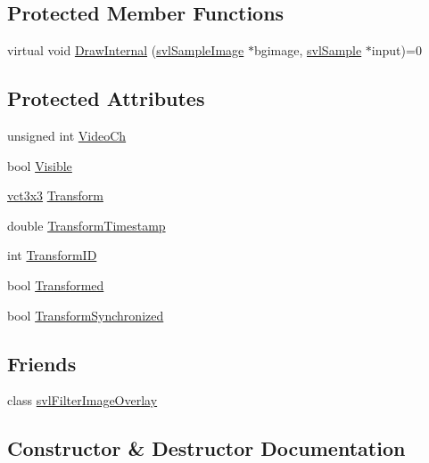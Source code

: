 \subsection*{Protected Member Functions}
\begin{DoxyCompactItemize}
\item 
virtual void \hyperlink{classsvl_overlay_a6e6e5650596284a59be75be7dc073cd2}{Draw\+Internal} (\hyperlink{classsvl_sample_image}{svl\+Sample\+Image} $\ast$bgimage, \hyperlink{classsvl_sample}{svl\+Sample} $\ast$input)=0
\end{DoxyCompactItemize}
\subsection*{Protected Attributes}
\begin{DoxyCompactItemize}
\item 
unsigned int \hyperlink{classsvl_overlay_a3cb587204bc369c7f692d0db7cb74e72}{Video\+Ch}
\item 
bool \hyperlink{classsvl_overlay_a9cdf3aba60b4c4a291a5adc1c1cba139}{Visible}
\item 
\hyperlink{vct_fixed_size_matrix_types_8h_aac4a419dacf9282410675d42ebc86a7c}{vct3x3} \hyperlink{classsvl_overlay_aec4ed3a91cfa3ef0012587ac32f8e967}{Transform}
\item 
double \hyperlink{classsvl_overlay_a5b67a9b8184c00fd1f1eddf10714efc0}{Transform\+Timestamp}
\item 
int \hyperlink{classsvl_overlay_a1e0977a50e855ca752620d65907930c2}{Transform\+I\+D}
\item 
bool \hyperlink{classsvl_overlay_a1cc57b52eed3186e7a71b9611e9562cf}{Transformed}
\item 
bool \hyperlink{classsvl_overlay_aa963847ea083493fc20a7a1c9031c478}{Transform\+Synchronized}
\end{DoxyCompactItemize}
\subsection*{Friends}
\begin{DoxyCompactItemize}
\item 
class \hyperlink{classsvl_overlay_a83f118ae07b7352f907d08378ed1e2a8}{svl\+Filter\+Image\+Overlay}
\end{DoxyCompactItemize}


\subsection{Constructor \& Destructor Documentation}
\hypertarget{classsvl_overlay_a1751015ce9ab4481c6c0b784646f52ae}{}
